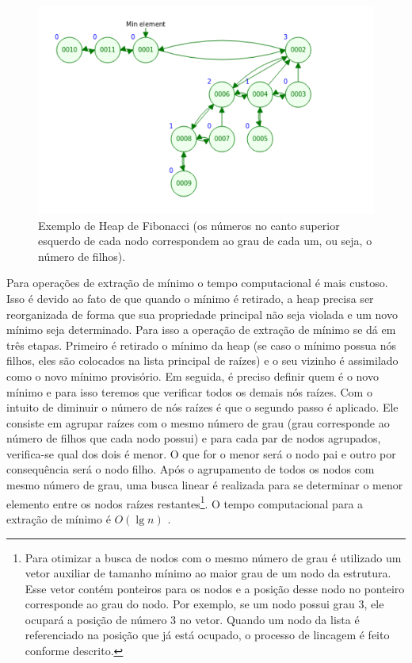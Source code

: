 \begin{figure}[H]
\centering
\includegraphics[width=.54\textwidth]{figuras/fibonacci-heap1} 
\caption{Exemplo de Heap de Fibonacci (os números no canto superior esquerdo de cada nodo correspondem ao grau de cada um, ou seja, o número de filhos).}
\label{fig-dijkstra-heapfibonacci1}
\end{figure}

Para operações de extração de mínimo o tempo computacional é mais custoso. Isso é devido ao fato de que quando o mínimo é retirado, a heap precisa ser reorganizada de forma que sua propriedade principal não seja violada e um novo mínimo seja determinado. Para isso a operação de extração de mínimo se dá em três etapas. Primeiro é retirado o mínimo da heap (se caso o mínimo possua nós filhos, eles são colocados na lista principal de raízes) e o seu vizinho é assimilado como o novo mínimo provisório. Em seguida, é preciso definir quem é o novo mínimo e para isso teremos que verificar todos os demais nós raízes. Com o intuito de diminuir o número de nós raízes é que o segundo passo é aplicado.  Ele consiste em agrupar raízes com o mesmo número de grau (grau corresponde ao número de filhos que cada nodo possui) e para cada par de nodos agrupados, verifica-se qual dos dois é menor. O que for o menor será o nodo pai e outro por consequência será o nodo filho. Após o agrupamento de todos os nodos com mesmo número de grau, uma busca linear é realizada para se determinar o menor elemento entre os nodos raízes restantes\footnote{Para otimizar a busca de nodos com o mesmo número de grau é utilizado um vetor auxiliar de tamanho mínimo ao maior grau de um nodo da estrutura. Esse vetor contém ponteiros para os nodos e a posição desse nodo no ponteiro corresponde ao grau do nodo. Por exemplo, se um nodo possui grau 3, ele ocupará a posição de número 3 no vetor. Quando um nodo da lista é referenciado na posição que já está ocupado, o processo de lincagem é feito conforme descrito.}. O tempo computacional para a extração de mínimo é $O(\lg n)$ \cite{cormen2009introduction}.

